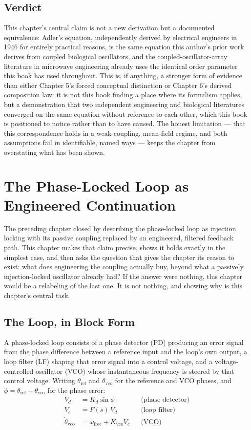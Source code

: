 \documentclass[12pt]{article}
\begin{document}
\subsection*{Verdict}

This chapter's central claim is not a new derivation but a documented equivalence: Adler's equation, independently derived by electrical engineers in 1946 for entirely practical reasons, is the same equation this author's prior work derives from coupled biological oscillators, and the coupled-oscillator-array literature in microwave engineering already uses the identical order parameter this book has used throughout. This is, if anything, a stronger form of evidence than either Chapter 5's forced conceptual distinction or Chapter 6's derived composition law: it is not this book finding a place where its formalism applies, but a demonstration that two independent engineering and biological literatures converged on the same equation without reference to each other, which this book is positioned to notice rather than to have caused. The honest limitation --- that this correspondence holds in a weak-coupling, mean-field regime, and both assumptions fail in identifiable, named ways --- keeps the chapter from overstating what has been shown.

\section{The Phase-Locked Loop as Engineered Continuation}

The preceding chapter closed by describing the phase-locked loop as injection locking with its passive coupling replaced by an engineered, filtered feedback path. This chapter makes that claim precise, shows it holds exactly in the simplest case, and then asks the question that gives the chapter its reason to exist: what does engineering the coupling actually buy, beyond what a passively injection-locked oscillator already had? If the answer were nothing, this chapter would be a relabeling of the last one. It is not nothing, and showing why is this chapter's central task.

\subsection{The Loop, in Block Form}

A phase-locked loop consists of a phase detector (PD) producing an error signal from the phase difference between a reference input and the loop's own output, a loop filter (LF) shaping that error signal into a control voltage, and a voltage-controlled oscillator (VCO) whose instantaneous frequency is steered by that control voltage. Writing $\theta_{\text{ref}}$ and $\theta_{\text{vco}}$ for the reference and VCO phases, and $\phi = \theta_{\text{ref}} - \theta_{\text{vco}}$ for the phase error:
\begin{align*}
V_d &= K_d \sin\phi &&\text{(phase detector)} \\
V_c &= F(s)\, V_d &&\text{(loop filter)} \\
\dot\theta_{\text{vco}} &= \omega_{\text{free}} + K_{\text{vco}} V_c &&\text{(VCO)}
\end{align*}
\end{document}
